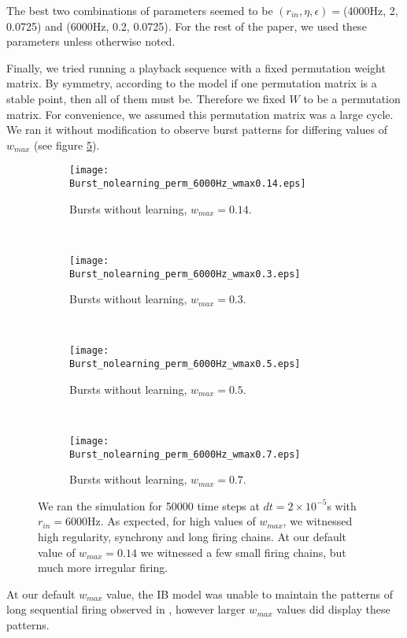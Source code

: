 The best two combinations of parameters seemed to be \((r_{in},\eta,\epsilon) = \)(4000Hz, 2, 0.0725) and (6000Hz, 0.2, 0.0725). For the rest of the paper, we used these parameters unless otherwise noted.

Finally, we tried running a playback sequence with a fixed permutation weight matrix. By symmetry, according to the model if one permutation matrix is a stable point, then all of them must be. Therefore we fixed \(W\) to be a permutation matrix. For convenience, we assumed this permutation matrix was a large cycle. We ran it without modification to observe burst patterns for differing values of \(w_{max}\) (see figure \ref{Burst_no_learning}).

\begin{figure}[H]
\centering
\begin{subfigure}[b]{0.49\textwidth}
\texttt{[image: Burst\_nolearning\_perm\_6000Hz\_wmax0.14.eps]}
\caption{Bursts without learning, \(w_{max} = 0.14\).}
\label{Burst_no_learning: 0.14}
\end{subfigure}
\,
\begin{subfigure}[b]{0.49\textwidth}
\texttt{[image: Burst\_nolearning\_perm\_6000Hz\_wmax0.3.eps]}
\caption{Bursts without learning, \(w_{max} = 0.3\).}
\label{Burst_no_learning: 0.3}
\end{subfigure}
\\
\begin{subfigure}[b]{0.49\textwidth}
\texttt{[image: Burst\_nolearning\_perm\_6000Hz\_wmax0.5.eps]}
\caption{Bursts without learning, \(w_{max} = 0.5\).}
\label{Burst_no_learning: 0.5}
\end{subfigure}
\,
\begin{subfigure}[b]{0.49\textwidth}
\texttt{[image: Burst\_nolearning\_perm\_6000Hz\_wmax0.7.eps]}
\caption{Bursts without learning, \(w_{max} = 0.7\).}
\label{Burst_no_learning: 0.7}
\end{subfigure}
\caption{We ran the simulation for 50000 time steps at \(dt = 2\times 10^{-5}\)s with \(r_{in} = 6000\)Hz. As expected, for high values of \(w_{max}\), we witnessed high regularity, synchrony and long firing chains. At our default value of \(w_{max} = 0.14\) we witnessed a few small firing chains, but much more irregular firing.}
\label{Burst_no_learning}
\end{figure}

At our default \(w_{max}\) value, the IB model was unable to maintain the patterns of long sequential firing observed in \cite{Fiete}, however larger \(w_{max}\) values did display these patterns.

